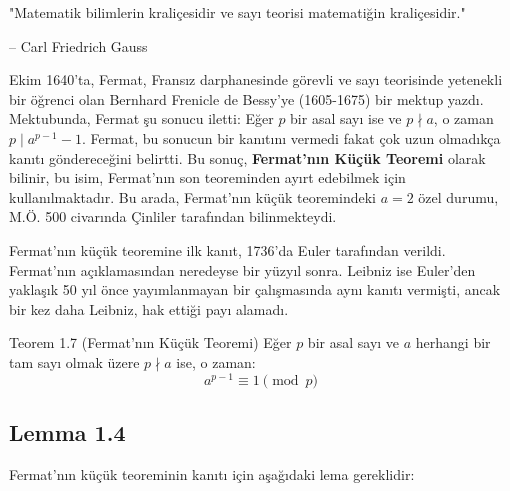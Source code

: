 \begin{tcolorbox}[colback=gray!5, colframe=black]
\justifying
"Matematik bilimlerin kraliçesidir ve sayı teorisi matematiğin kraliçesidir."

\vspace{0.3cm}
\raggedleft
-- Carl Friedrich Gauss
\end{tcolorbox}

 Ekim 1640'ta, Fermat, Fransız darphanesinde görevli ve sayı teorisinde yetenekli bir öğrenci olan Bernhard Frenicle de Bessy'ye (1605-1675) bir mektup yazdı. Mektubunda, Fermat şu sonucu iletti: Eğer $p$ bir asal sayı ise ve $p \nmid a$, o zaman $p \mid a^{p-1} - 1$. Fermat, bu sonucun bir kanıtını vermedi fakat çok uzun olmadıkça kanıtı göndereceğini belirtti. Bu sonuç, \textbf{Fermat'nın Küçük Teoremi} olarak bilinir, bu isim, Fermat'nın son teoreminden ayırt edebilmek için kullanılmaktadır. Bu arada, Fermat'nın küçük teoremindeki $a = 2$ özel durumu, M.Ö. 500 civarında Çinliler tarafından bilinmekteydi.

Fermat'nın küçük teoremine ilk kanıt, 1736'da Euler tarafından verildi. Fermat'nın açıklamasından neredeyse bir yüzyıl sonra. Leibniz ise Euler'den yaklaşık 50 yıl önce yayımlanmayan bir çalışmasında aynı kanıtı vermişti, ancak bir kez daha Leibniz, hak ettiği payı alamadı.

\begin{theorembox}{Teorem 1.7 (Fermat'nın Küçük Teoremi)}
Eğer $p$ bir asal sayı ve $a$ herhangi bir tam sayı olmak üzere $p \nmid a$ ise, o zaman:
\[
a^{p-1} \equiv 1 \pmod{p}
\]
\end{theorembox}

\subsection*{Lemma 1.4}
Fermat'nın küçük teoreminin kanıtı için aşağıdaki lema gereklidir:

